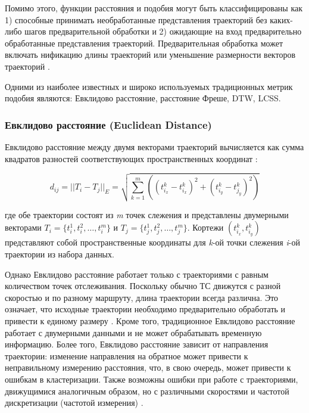 Помимо этого, функции расстояния и подобия могут быть классифицированы как 1) способные принимать необработанные представления траекторий без каких-либо шагов предварительной обработки и 2) ожидающие на вход предварительно обработанные представления траекторий. Предварительная обработка может включать нификацию длины траекторий или уменьшение размерности векторов траекторий \cite{inproceedings:7_related_work}.

Одними из наиболее известных и широко используемых традиционных метрик подобия являются: Евклидово расстояние, расстояние Фреше, DTW, LCSS.

\subsubsection{Евклидово расстояние (Euclidean Distance)}

Евклидово расстояние между двумя векторами траекторий вычисляется как сумма квадратов разностей соответствующих пространственных координат \cite{article:27_vna_cad_td}:

\begin{equation}
	 d_{ij} = ||T_i - T_j||_E = \sqrt{\sum_{k=1}^{m}((t_{i_x}^k - t_{i_x}^k)^2 + (t_{i_y}^k - t_{j_y}^k)^2)}
\end{equation}

где обе траектории состоят из \textit{m} точек слежения и представлены двумерными векторами $T_i = \{t_i^1, t_i^2, \ldots, t_i^m\}$ и $T_j = \{t_j^1, t_j^2, \ldots, t_j^m\}$. Кортежи $(t_{i_x}^k, t_{i_y}^k)$ представляют собой пространственные координаты для \textit{k}-ой точки слежения \textit{i}-ой траектории из набора данных.

Однако Евклидово расстояние работает только с траекториями с равным количеством точек отслеживания. Поскольку обычно ТС движутся с разной скоростью и по разному маршруту, длина траектории всегда различна. Это означает, что исходные траектории необходимо предварительно обработать и привести к единому размеру \cite{inproceedings:7_related_work}. Кроме того, традиционное Евклидово расстояние работает с двумерными данными и не может обрабатывать временную информацию. Более того, Евклидово расстояние зависит от направления траектории: изменение направления на обратное может привести к неправильному измерению расстояния, что, в свою очередь, может привести к ошибкам в кластеризации. Также возможны ошибки при работе с траекториями, движущимися аналогичным образом, но с различными скоростями и частотой дискретизации (частотой измерения) \cite{inproceedings:28_lcss_dsmt}.

